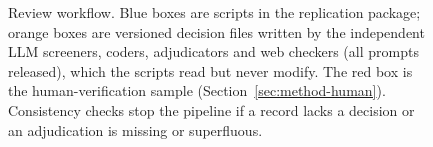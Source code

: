 \begin{figure}[t]
\caption{Review workflow. Blue boxes are scripts in the replication package; orange boxes are versioned decision files written by the independent LLM screeners, coders, adjudicators and web checkers (all prompts released), which the scripts read but never modify. The red box is the human-verification sample (Section~\ref{sec:method-human}). Consistency checks stop the pipeline if a record lacks a decision or an adjudication is missing or superfluous.}
\label{fig:pipeline}
\end{figure}
